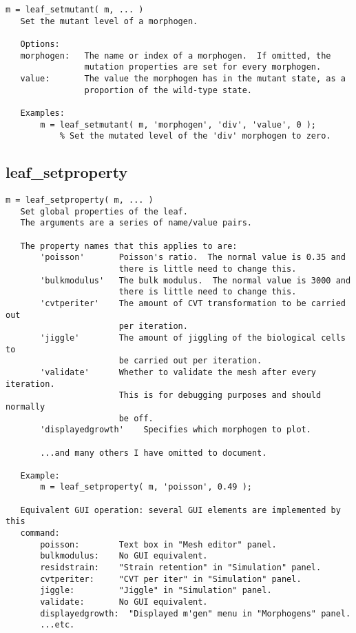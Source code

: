\begin{verbatim}
m = leaf_setmutant( m, ... )
   Set the mutant level of a morphogen.

   Options:
   morphogen:   The name or index of a morphogen.  If omitted, the
                mutation properties are set for every morphogen.
   value:       The value the morphogen has in the mutant state, as a
                proportion of the wild-type state.

   Examples:
       m = leaf_setmutant( m, 'morphogen', 'div', 'value', 0 );
           % Set the mutated level of the 'div' morphogen to zero.
\end{verbatim}

\subsection{leaf\_setproperty}\label{section-leaf-setproperty}

\begin{verbatim}
m = leaf_setproperty( m, ... )
   Set global properties of the leaf.
   The arguments are a series of name/value pairs.

   The property names that this applies to are:
       'poisson'       Poisson's ratio.  The normal value is 0.35 and
                       there is little need to change this.
       'bulkmodulus'   The bulk modulus.  The normal value is 3000 and
                       there is little need to change this.
       'cvtperiter'    The amount of CVT transformation to be carried out
                       per iteration.
       'jiggle'        The amount of jiggling of the biological cells to
                       be carried out per iteration.
       'validate'      Whether to validate the mesh after every iteration.
                       This is for debugging purposes and should normally
                       be off.
       'displayedgrowth'    Specifies which morphogen to plot.

       ...and many others I have omitted to document.

   Example:
       m = leaf_setproperty( m, 'poisson', 0.49 );

   Equivalent GUI operation: several GUI elements are implemented by this
   command:
       poisson:        Text box in "Mesh editor" panel.
       bulkmodulus:    No GUI equivalent.
       residstrain:    "Strain retention" in "Simulation" panel.
       cvtperiter:     "CVT per iter" in "Simulation" panel.
       jiggle:         "Jiggle" in "Simulation" panel.
       validate:       No GUI equivalent.
       displayedgrowth:  "Displayed m'gen" menu in "Morphogens" panel.
       ...etc.
\end{verbatim}

